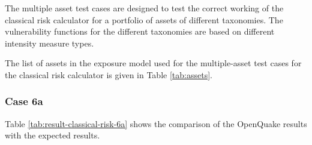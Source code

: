 The multiple asset test cases are designed to test the correct working of the classical risk calculator for a portfolio of assets of different taxonomies. The vulnerability functions for the different taxonomies are based on different intensity measure types.

The list of assets in the exposure model used for the multiple-asset test cases for the classical risk calculator is given in Table \ref{tab:assets}.

\subsubsection{Case 6a}




Table \ref{tab:result-classical-risk-6a} shows the comparison of the OpenQuake results with the expected results.